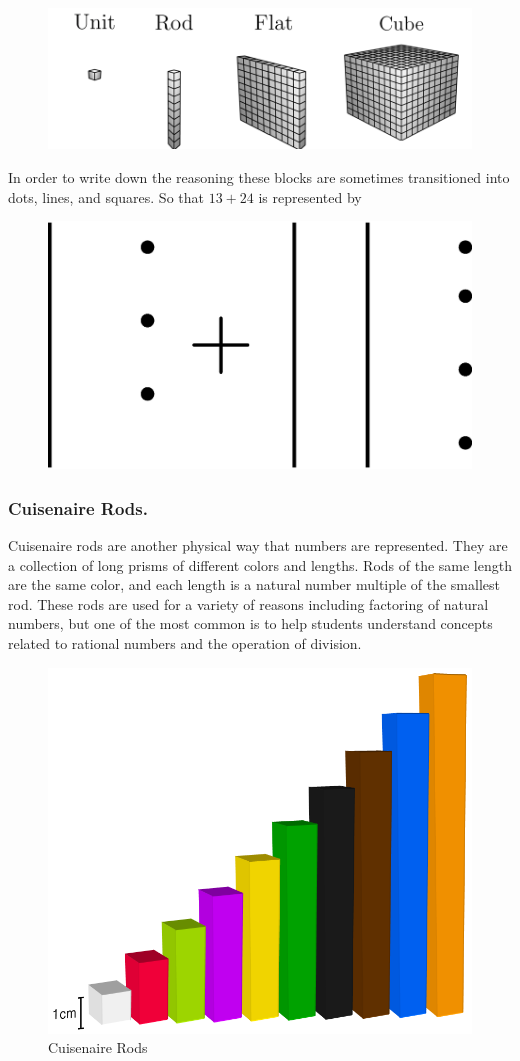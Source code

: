 \documentclass[
]{book}
\theoremstyle{definition}
\theoremstyle{definition}
\theoremstyle{definition}
\theoremstyle{definition}
\theoremstyle{remark}
\begin{document}
\begin{figure}

{\centering \includegraphics[width=0.8\linewidth]{tikz/base10blocks} 

}

\end{figure}

In order to write down the reasoning these blocks are sometimes transitioned into dots, lines, and squares. So that \(13+24\) is represented by

\begin{figure}

{\centering \includegraphics[width=0.6\linewidth]{tikz/base10block-addition} 

}

\end{figure}

\hypertarget{cuisenaire-rods.}{%
\subsubsection*{Cuisenaire Rods.}\label{cuisenaire-rods.}}

Cuisenaire rods are another physical way that numbers are represented. They are a collection of long prisms of different colors and lengths. Rods of the same length are the same color, and each length is a natural number multiple of the smallest rod. These rods are used for a variety of reasons including factoring of natural numbers, but one of the most common is to help students understand concepts related to rational numbers and the operation of division.

\begin{figure}

{\centering \includegraphics[width=0.3\linewidth]{images/Cuisenaire-Rods-2} 

}

\caption{Cuisenaire Rods}\label{fig:unnamed-chunk-18}
\end{figure}
\end{document}
